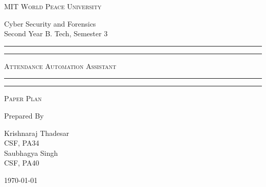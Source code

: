 \documentclass[11pt]{article}
\begin{document}
\begin{titlepage}
	\centering


	\huge\textsc{
		MIT World Peace University
	}\\

	\vspace{0.75\baselineskip} %

	\LARGE{
		Cyber Security and Forensics\\
		Second Year B. Tech, Semester 3
	}

	\vfill %


	\rule{\textwidth}{1.6pt}\vspace*{-\baselineskip}\vspace*{2pt}
	\rule{\textwidth}{0.6pt}
	\vspace{0.75\baselineskip} %



	\huge{\textsc{
			Attendance Automation Assistant
		}} \\



	\vspace{0.5\baselineskip} %
	\rule{\textwidth}{0.6pt}\vspace*{-\baselineskip}\vspace*{2.8pt}
	\rule{\textwidth}{1.6pt}

	\vspace{1\baselineskip} %


	\LARGE\textsc{
		Paper Plan
	} %
	\vfill


	Prepared By
	\vspace{0.5\baselineskip} %

	\Large{
		Krishnaraj Thadesar \\
		CSF, PA34 \\
		Saubhagya Singh\\
		CSF, PA40
	}


	\vspace{0.5\baselineskip} %
	\today

\end{titlepage}
\end{document}
